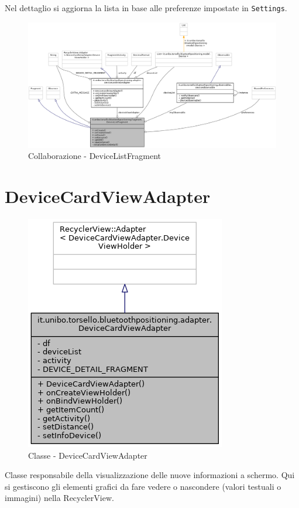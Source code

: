 Nel dettaglio si aggiorna la lista in base alle preferenze impostate in \texttt{Settings}.

\begin{figure}[ph]
	\centering
	\includegraphics[width=1.6\linewidth,angle=90]{img/uml/class/classit_1_1unibo_1_1torsello_1_1bluetoothpositioning_1_1fragment_1_1DeviceListFragment__coll__graph.png}
	\caption{Collaborazione - DeviceListFragment}
\end{figure}

\newpage
\section{DeviceCardViewAdapter}
\begin{figure}[ph]
	\centering
	\includegraphics[width=0.5\linewidth]{img/uml/class/classit_1_1unibo_1_1torsello_1_1bluetoothpositioning_1_1adapter_1_1DeviceCardViewAdapter__inherit__graph.png}
	\caption{Classe - DeviceCardViewAdapter}
\end{figure}

Classe responsabile della visualizzazione delle nuove informazioni a schermo. Qui si gestiscono gli elementi grafici da fare vedere o nascondere (valori testuali o immagini) nella RecyclerView.

